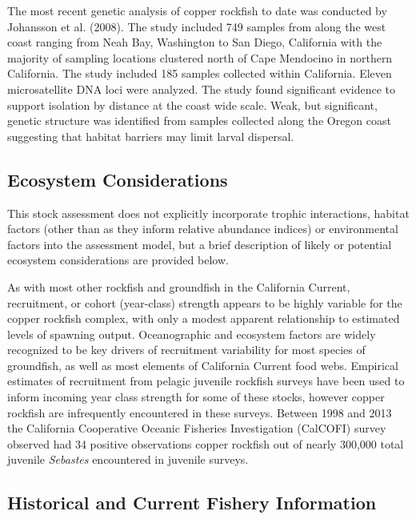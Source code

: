\documentclass[11pt,
  english,
  letterpaper,
]{article}
\begin{document}
The most recent genetic analysis of copper rockfish to date was conducted by Johansson et al. (2008). The study included 749 samples from along the west coast ranging from Neah Bay, Washington to San Diego, California with the majority of sampling locations clustered north of Cape Mendocino in northern California. The study included 185 samples collected within California. Eleven microsatellite DNA loci were analyzed. The study found significant evidence to support isolation by distance at the coast wide scale. Weak, but significant, genetic structure was identified from samples collected along the Oregon coast suggesting that habitat barriers may limit larval dispersal.

\hypertarget{ecosystem-considerations-1}{%
\subsection{Ecosystem Considerations}\label{ecosystem-considerations-1}}

This stock assessment does not explicitly incorporate trophic interactions, habitat factors (other than as they inform relative abundance indices) or environmental factors into the assessment model, but a brief description of likely or potential ecosystem considerations are provided below.

As with most other rockfish and groundfish in the California Current, recruitment, or cohort (year-class) strength appears to be highly variable for the copper rockfish complex, with only a modest apparent relationship to estimated levels of spawning output. Oceanographic and ecosystem factors are widely recognized to be key drivers of recruitment variability for most species of groundfish, as well as most elements of California Current food webs. Empirical estimates of recruitment from pelagic juvenile rockfish surveys have been used to inform incoming year class strength for some of these stocks, however copper rockfish are infrequently encountered in these surveys. Between 1998 and 2013 the California Cooperative Oceanic Fisheries Investigation (CalCOFI) survey observed had 34 positive observations copper rockfish out of nearly 300,000 total juvenile \emph{Sebastes} encountered in juvenile surveys.

\hypertarget{historical-and-current-fishery-information}{%
\subsection{Historical and Current Fishery Information}\label{historical-and-current-fishery-information}}
\end{document}
